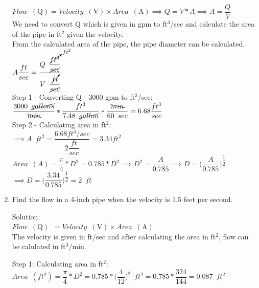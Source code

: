\documentclass{article}
\begin{document}
\begin{enumerate}
$Flow \enspace(\mathrm{Q})= Velocity \enspace(\mathrm{V})  \times Area \enspace(\mathrm{A}) \implies Q=V*A \implies A=\dfrac{Q}{V}$\\
We need to convert Q which is given in gpm to ft${^3}$/sec and calculate the area of the pipe in ft${^2}$ given the velocity.\\
From the calculated area of the pipe, the pipe diameter can be calculated.\\
\vspace{0.2cm}
$ A \dfrac{ft}{sec} = \dfrac{Q \enspace \dfrac{\cancelto{ft^2}{ft^3}}{\cancel{sec}}}{V \enspace \dfrac{\cancelto{}{ft}}{\cancel{sec}}}$\\
\vspace{0.2cm}
Step 1 - Converting Q - 3000 gpm to ft${^3}$/sec:\\
\vspace{0.2cm}
$\dfrac{3000 \enspace \cancel{gallons}}{\bcancel{min}}*\dfrac{ft^3}{7.48 \enspace \cancel{gallon}}*\dfrac{\bcancel{min}}{60 \enspace sec}=6.68\dfrac{ft^3}{sec}$\\
\vspace{0.2cm}
Step 2 - Calculating area in ft${^2}$:\\
\vspace{0.2cm}
$\implies A \enspace ft^2 = \dfrac{ 6.68 ft^3/sec}{2 \dfrac{ft}{sec}} = 3.34 ft^2$\\
\vspace{0.3cm} 
$Area \enspace (A)= \dfrac{\pi}{4}*D^2 = 0.785*D^2 \implies D^2=\dfrac{A}{0.785} \implies D=\Big(\dfrac{A }{0.785}\Big)^{\dfrac{1}{2}}$\\
$\implies D=\Big(\dfrac{3.34}{0.785}\Big)^{\dfrac{1}{2}}=\boxed{2 \enspace ft}$\\
\vspace{0.2cm}

\item Find the flow in a 4-inch pipe when the velocity is $1.5$ feet per second.

Solution:\\
$Flow \enspace(\mathrm{Q}) \enspace = Velocity \enspace(\mathrm{V})  \times Area \enspace(\mathrm{A})$\\
\vspace{0.2cm}
The velocity is given in ft/sec and after calculating the area in ft$^2$, flow can be calulated in ft$^3$/min.\\
\vspace{0.2cm}

\vspace{0.2cm}
Step 1:  Calculating area in ft${^2}$:\\
\vspace{0.2cm}
$Area \enspace (ft^2)= \dfrac{\pi}{4}*D^2= 0.785*\Big(\dfrac{4}{12}\Big)^2 \enspace ft^2=0.785*\dfrac{324}{144}=0.087 \enspace ft^2$\\
\vspace{0.2cm}


\end{enumerate}
\end{document}
